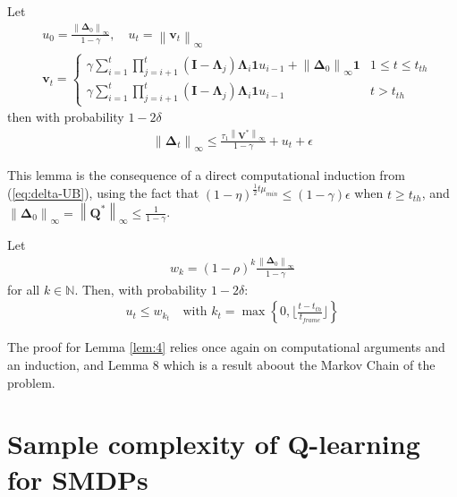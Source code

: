 \begin{lem}[Lemma 3]\label{lem:3}
  Let
  \begin{align}
    &u_0 = \frac{\left\| \mathbf{\Delta}_0 \right\|_\infty}{1-\gamma}, \quad u_t = \left\| \mathbf{v}_t \right\|_\infty\\
    &\mathbf{v}_t = \begin{cases}\gamma \sum_{i=1}^{t}\prod_{j=i+1}^{t}(\mathbf{I}-\mathbf{\Lambda}_j)\mathbf{\Lambda}_i \mathbf{1}u_{i-1} + \left\| \mathbf{\Delta}_0 \right\|_\infty \mathbf{1} & 1 \leq t \leq t_{th}\\ \gamma \sum_{i=1}^{t}\prod_{j=i+1}^{t}(\mathbf{I}-\mathbf{\Lambda}_j)\mathbf{\Lambda}_i \mathbf{1}u_{i-1} & t >t_{th} \end{cases}
  \end{align}
  then with probability $1 - 2\delta$
  \begin{align}
    \left\| \mathbf{\Delta}_t \right\|_\infty \leq \frac{\tau_1 \left\| \mathbf{V}^* \right\|_\infty}{1-\gamma} + u_t + \epsilon
  \end{align}
\end{lem}

This lemma is the consequence of a direct computational induction from (\ref{eq:delta-UB}), using the fact that $(1-\eta)^{\frac{1}{2}t \mu_{min}} \leq (1 - \gamma)\epsilon$ when $t \geq t_{th}$, and $\left\| \mathbf{\Delta}_0 \right\|_\infty = \left\| \mathbf{Q}^* \right\|_\infty \leq \frac{1}{1-\gamma}$.

\begin{lem}[Lemma 4]\label{lem:4}
  Let
  \begin{align}
    w_k = (1 - \rho)^k \frac{\left\| \mathbf{\Delta}_0 \right\|_\infty}{1-\gamma}
  \end{align}
  for all $k\in \mathbb{N}$. Then, with probability $1 - 2\delta$:
  \begin{align}
    u_t \leq w_{k_t} \quad \text{with } k_t = \max \left\{ 0, \lfloor \frac{t - t_{th}}{t_{frame}} \rfloor \right\}
  \end{align}
\end{lem}

The proof for Lemma \ref{lem:4} relies once again on computational arguments and an induction, and Lemma 8 which is a result aboout the Markov Chain of the problem.

\section{Sample complexity of Q-learning for SMDPs}

